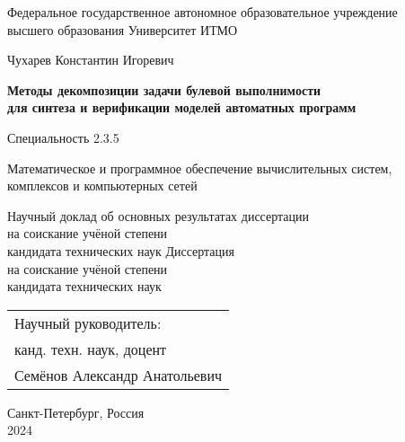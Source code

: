 \thispagestyle{empty}

\begin{center}
    Федеральное государственное автономное образовательное учреждение \\
    высшего образования Университет ИТМО
\end{center}

\vspace{0pt plus2fill}

\begin{center}

{\large
    Чухарев Константин Игоревич
}

\vspace{1cm}

\textbf{\large
Методы декомпозиции задачи булевой выполнимости \\
для синтеза и верификации моделей автоматных программ
}

\vspace{1cm}

Специальность 2.3.5
\begin{SingleSpace*}
    \small
    Математическое и программное обеспечение вычислительных систем, \\
    комплексов и компьютерных сетей
\end{SingleSpace*}

\vspace{1cm}

\ifsynopsis
Научный доклад об основных результатах диссертации \\
на соискание учёной степени \\
кандидата технических наук
\else
Диссертация \\
на соискание учёной степени \\
кандидата технических наук
\fi

\end{center}

\vspace{0pt plus1fill}

\hfill\begin{tabular}{l}
Научный руководитель: \\
канд. техн. наук, доцент \\
Семёнов Александр Анатольевич
\end{tabular}

\vspace{0pt plus1fill}

\begin{center}
    Санкт-Петербург, Россия \\
    2024
\end{center}
